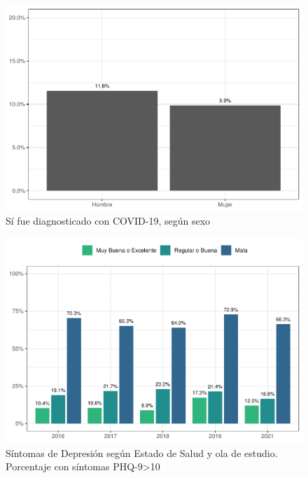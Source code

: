 \documentclass[
  12pt,
]{book}
\begin{document}
\begin{figure}

{\centering \includegraphics{reporte-elsoc_files/figure-latex/covid-sexo-1} 

}

\caption{Sí fue diagnosticado con COVID-19, según sexo}\label{fig:covid-sexo}
\end{figure}

\begin{figure}

{\centering \includegraphics{reporte-elsoc_files/figure-latex/depre-s03-1} 

}

\caption{Síntomas de Depresión según Estado de Salud y ola de estudio. Porcentaje con síntomas PHQ-9>10}\label{fig:depre-s03}
\end{figure}
\end{document}
